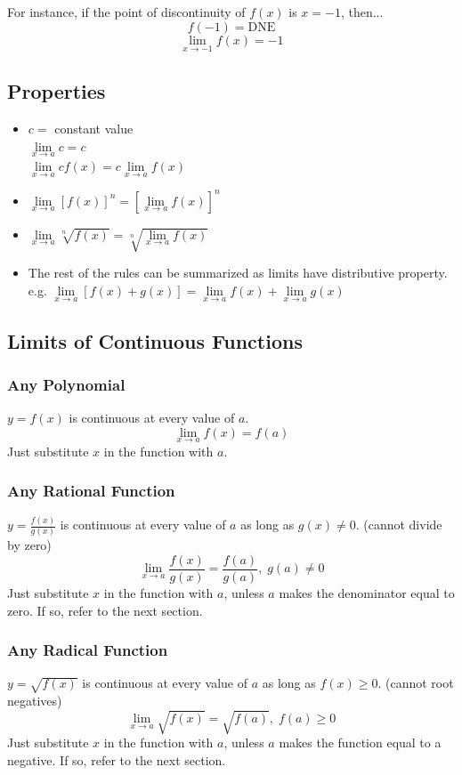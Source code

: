 \documentclass[a4paper,12pt]{article}
\begin{document}
For instance, if the point of discontinuity of $f(x)$ is $x = -1$, then...
$$f(-1) = \textrm{DNE}$$
$$\lim\limits_{x \to -1} f(x) = -1$$

\subsection{Properties}
\begin{itemize}
    \item{$c = $ constant value \\ $\lim\limits_{x \to a} c = c$ \\ $\lim\limits_{x \to a} c f(x) = c \lim\limits_{x \to a} f(x)$}
    \item{$\lim\limits_{x \to a} [f(x)]^n = [\lim\limits_{x \to a} f(x)]^n$}
    \item{$\lim\limits_{x \to a} \sqrt[n]{f(x)} = \sqrt[n]{\lim\limits_{x \to a} f(x)}$}
    \item{The rest of the rules can be summarized as limits have distributive property. \\ e.g. $\lim\limits_{x \to a}[f(x) + g(x)] = \lim\limits_{x \to a} f(x) + \lim\limits_{x \to a} g(x)$}
\end{itemize}

\pagebreak

\subsection{Limits of Continuous Functions}
\subsubsection{Any Polynomial}
$y = f(x)$ is continuous at every value of $a$. 
$$\lim\limits_{x \to a} f(x) = f(a)$$
Just substitute $x$ in the function with $a$.

\subsubsection{Any Rational Function}
$y = \frac{f(x)}{g(x)}$ is continuous at every value of $a$ as long as $g(x) \neq 0$. (cannot divide by zero)
$$\lim\limits_{x \to a} \frac{f(x)}{g(x)} = \frac{f(a)}{g(a)},\; g(a) \neq 0$$
Just substitute $x$ in the function with $a$, unless $a$ makes the denominator equal to zero. If so, refer to the next section.

\subsubsection{Any Radical Function}
$y = \sqrt{f(x)}$ is continuous at every value of $a$ as long as $f(x) \geq 0$. (cannot root negatives)
$$\lim\limits_{x \to a} \sqrt{f(x)} = \sqrt{f(a)},\; f(a) \geq 0$$
Just substitute $x$ in the function with $a$, unless $a$ makes the function equal to a negative. If so, refer to the next section.
\end{document}
